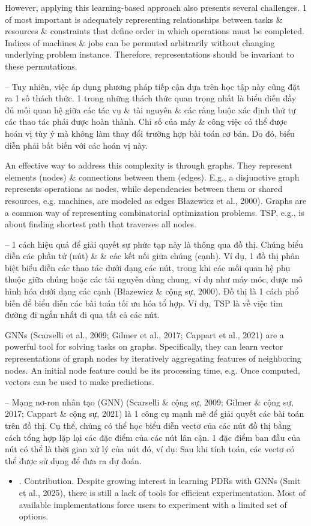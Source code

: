 \documentclass{article}
\begin{document}
\begin{itemize}
    However, applying this learning-based approach also presents several challenges. 1 of most important is adequately representing relationships between tasks \& resources \& constraints that define order in which operations must be completed. Indices of machines \& jobs can be permuted arbitrarily without changing underlying problem instance. Therefore, representations should be invariant to these permutations.

    -- Tuy nhiên, việc áp dụng phương pháp tiếp cận dựa trên học tập này cũng đặt ra 1 số thách thức. 1 trong những thách thức quan trọng nhất là biểu diễn đầy đủ mối quan hệ giữa các tác vụ \& tài nguyên \& các ràng buộc xác định thứ tự các thao tác phải được hoàn thành. Chỉ số của máy \& công việc có thể được hoán vị tùy ý mà không làm thay đổi trường hợp bài toán cơ bản. Do đó, biểu diễn phải bất biến với các hoán vị này.

    An effective way to address this complexity is through graphs. They represent elements (nodes) \& connections between them (edges). E.g., a disjunctive graph represents operations as nodes, while dependencies between them or shared resources, e.g. machines, are modeled as edges Błazewicz et al., 2000). Graphs are a common way of representing combinatorial optimization problems. TSP, e.g., is about finding shortest path that traverses all nodes.

    -- 1 cách hiệu quả để giải quyết sự phức tạp này là thông qua đồ thị. Chúng biểu diễn các phần tử (nút) \& \& các kết nối giữa chúng (cạnh). Ví dụ, 1 đồ thị phân biệt biểu diễn các thao tác dưới dạng các nút, trong khi các mối quan hệ phụ thuộc giữa chúng hoặc các tài nguyên dùng chung, ví dụ như máy móc, được mô hình hóa dưới dạng các cạnh (Błazewicz \& cộng sự, 2000). Đồ thị là 1 cách phổ biến để biểu diễn các bài toán tối ưu hóa tổ hợp. Ví dụ, TSP là về việc tìm đường đi ngắn nhất đi qua tất cả các nút.

    GNNs (Scarselli et al., 2009; Gilmer et al., 2017; Cappart et al., 2021) are a powerful tool for solving tasks on graphs. Specifically, they can learn vector representations of graph nodes by iteratively aggregating features of neighboring nodes. An initial node feature could be its processing time, e.g. Once computed, vectors can be used to make predictions.

    -- Mạng nơ-ron nhân tạo (GNN) (Scarselli \& cộng sự, 2009; Gilmer \& cộng sự, 2017; Cappart \& cộng sự, 2021) là 1 công cụ mạnh mẽ để giải quyết các bài toán trên đồ thị. Cụ thể, chúng có thể học biểu diễn vectơ của các nút đồ thị bằng cách tổng hợp lặp lại các đặc điểm của các nút lân cận. 1 đặc điểm ban đầu của nút có thể là thời gian xử lý của nút đó, ví dụ: Sau khi tính toán, các vectơ có thể được sử dụng để đưa ra dự đoán.
    \begin{itemize}
        \item {. Contribution.} Despite growing interest in learning PDRs with GNNs (Smit et al., 2025), there is still a lack of tools for efficient experimentation. Most of available implementations force users to experiment with a limited set of options.


\end{itemize}
\end{itemize}
\end{document}
